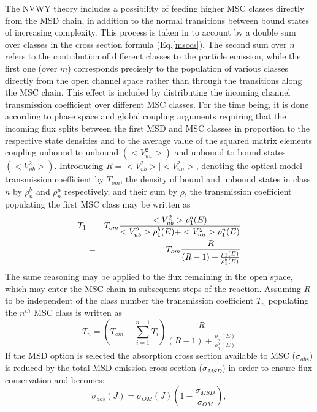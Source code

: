 The NVWY%
 theory includes a possibility of feeding higher MSC classes
directly from the MSD%
 chain, in addition to the normal transitions between bound
states of increasing complexity. This process is taken in to account by a
double sum over classes in the cross section formula (Eq.\ref{msccs}). The
second sum over $n$ refers to the contribution of different classes to the
particle emission, while the first one (over $m$) corresponds precisely to
the population of various classes directly from the open channel space
rather than through the transitions along the MSC chain. This effect is
included
by distributing the incoming channel transmission coefficient over different
MSC%
 classes. For the time being, it is done according to phase space
and global coupling arguments requiring that the incoming flux splits
between the first MSD%
 and MSC classes in proportion to the respective state densities
and to the average value of the squared matrix elements coupling unbound to
unbound $(<V_{uu}^{2}>)$ and unbound to bound states $(<V_{ub}^{2}>)$.
Introducing $R=<V_{ub}^{2}>\mid<V_{uu}^{2}>$, denoting the optical model
transmission coefficient by $T_{om}$, the density of bound and unbound
states in class $n$ by $\rho_{n}^{b}$ and $\rho_{n}^{u}$ respectively, and
their sum by $\rho$, the transmission coefficient populating the first MSC%
 class may be written as
\begin{eqnarray}
T_{1}&=&T_{om}%
\frac{<V_{ub}^{2}>\rho_{1}^{b}(E)}{<V_{ub}^{2}>\rho_{1}^{b}(E)+<V_{uu}^{2}>%
\rho_{1}^{u}(E)}  \notag \\
&=&T_{om}\frac{R}{(R-1)+\frac{\rho_{1}(E)}{\rho_{1}^{b}(E)}}  \label{eq9}
\end{eqnarray}
The same reasoning may be applied to the flux remaining in the open space,
which may enter the MSC%
 chain in subsequent steps of the reaction. Assuming $R$ to be
independent of the class number the transmission coefficient $T_{n}$
populating the $n^{th}$ MSC class is written as
\begin{equation}
T_{n}=\left(T_{om}-\sum_{i=1}^{n-1}T_{i}\right)%
\frac{R}{(R-1)+\frac{\rho_{n}(E)}{\rho_{n}^{b}(E)}}  \label{eq10}
\end{equation}
If the MSD%
 option is selected the absorption cross section available to MSC
($\sigma_{abs}$) is reduced by the total MSD emission cross section ($%
\sigma_{MSD}$) in order to ensure flux conservation and becomes:
\begin{equation}
\sigma_{abs}(J)=\sigma_{OM}(J)\left(1-%
\frac{\sigma_{MSD}}{\sigma_{OM}}\right),  \label{CNabs}
\end{equation}
